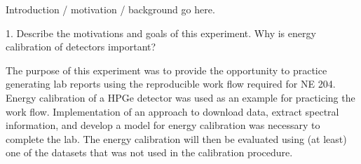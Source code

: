 Introduction / motivation / background go here.

1. Describe the motivations and goals of this experiment. Why is energy calibration of detectors important?

The purpose of this experiment was to provide the opportunity to practice generating lab reports using the reproducible work flow
required for NE 204. Energy calibration of a HPGe detector was used as an example for practicing the work flow. Implementation of
an approach to download data, extract spectral information, and develop a model for energy calibration was necessary to complete
the lab. The energy calibration will then be evaluated using (at least) one of the datasets that was not used in the calibration
procedure.
